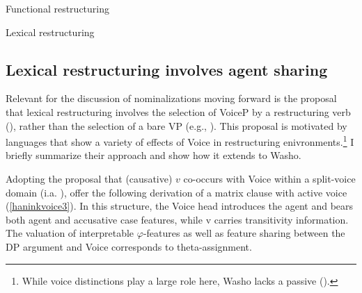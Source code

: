 \documentclass[output=paper]{langscibook}
\begin{document}
\begin{multicols}{2}\raggedcolumns
 \ea Functional restructuring\label{haninkvoice}\\
\z\columnbreak
 \ea Lexical restructuring\label{haninkvoice2}\\
\z 
\end{multicols}

\subsection{Lexical restructuring involves agent sharing}\label{haninksec:agent}

Relevant for the discussion of nominalizations moving forward is the proposal that lexical restructuring involves the selection of VoiceP by a restructuring verb (\citealt{wurmbrand2015,WurmbrandShimamura2017}), rather than the selection of a bare VP (e.g., \citealt{wurmbrand2001,Wurmbrand2004}).
This proposal is motivated by languages that show a variety of effects of Voice in restructuring enivronments.\footnote{While voice distinctions play a large role here, Washo lacks a passive (\citealt{jacobsen1979}).} I briefly summarize their approach and show how it extends to Washo. 

Adopting the proposal that (causative) $v$ co-occurs with Voice within a split-voice domain (i.a. \citealt{bowers2002,folliharley2005,alexiadouetal2006,marantz2008}),  \citet{WurmbrandShimamura2017} offer the following derivation of a matrix clause with active voice (\ref{haninkvoice3}). In this structure, the Voice head introduces the agent and bears both agent and accusative case features, while v carries transitivity information. The valuation of interpretable $\varphi$-features as well as feature sharing between the DP argument and Voice corresponds to theta-assignment.
 
 \ea \label{haninkvoice3}
\end{document}
